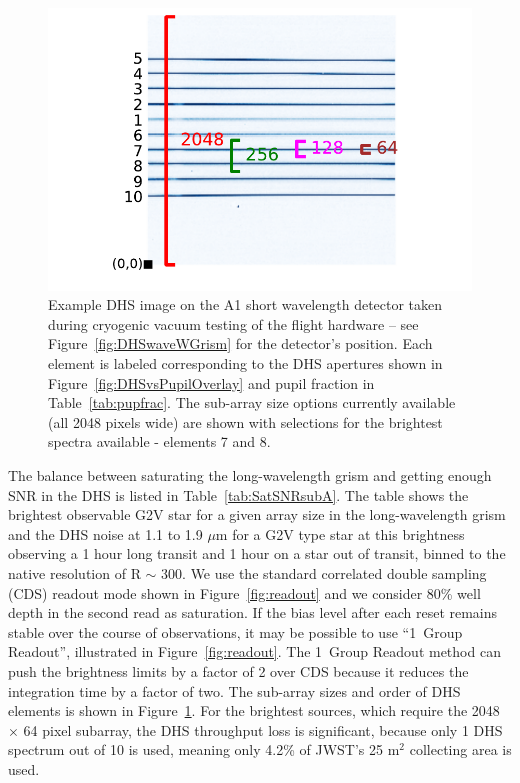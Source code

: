 \documentclass[iop]{emulateapj}
\newcommand{\DHSresApprox}{300}
\begin{document}
\begin{figure}[!t]
\includegraphics[width=1.0\columnwidth]{example_ap_sizes.pdf}
\caption{Example DHS image on the A1 short wavelength detector taken during cryogenic vacuum testing of the flight hardware -- see Figure~\ref{fig:DHSwaveWGrism} for the detector's position.
Each element is labeled corresponding to the DHS apertures shown in Figure~\ref{fig:DHSvsPupilOverlay} and pupil fraction in Table~\ref{tab:pupfrac}.
The sub-array size options currently available (all 2048 pixels wide) are shown with selections for the brightest spectra available - elements 7 and 8.}\label{fig:DHSaps}
\end{figure}

The balance between saturating the long-wavelength grism and getting enough SNR in the DHS is listed in Table~\ref{tab:SatSNRsubA}.
The table shows the brightest observable G2V star  for a given array size in the long-wavelength grism and the DHS noise at 1.1 to 1.9 $\mu$m for a G2V type star at this brightness observing a 1 hour long transit and 1 hour on a star out of transit, binned to the native resolution of R $\sim$ \DHSresApprox.
We use the standard correlated double sampling (CDS) readout mode shown in Figure~\ref{fig:readout} and we consider 80\% well depth in the second read as saturation.
If the bias level after each reset remains stable over the course of observations, it may be possible to use ``1~Group Readout'', illustrated in Figure~\ref{fig:readout}.
The 1~Group Readout method can push the brightness limits by a factor of 2 over CDS because it reduces the integration time by a factor of two.
The sub-array sizes and order of DHS elements is shown in Figure~\ref{fig:DHSaps}.
For the brightest sources, which require the 2048 $\times$ 64 pixel subarray, the DHS throughput loss is significant, because only 1 DHS spectrum out of 10 is used, meaning only 4.2\% of JWST's 25 m$^2$ collecting area is used.
\end{document}
